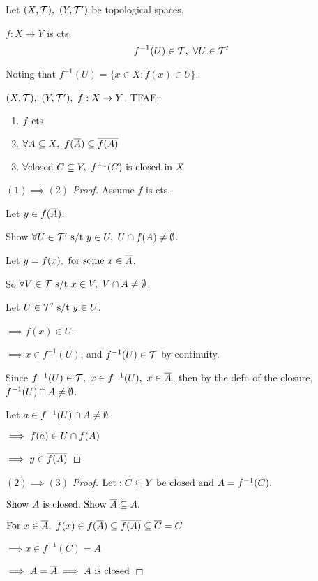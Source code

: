 \documentclass[12pt]{article}
\begin{document}
\bboxdefn
\begin{defn}
    Let \((X,\mathcal T),\ (Y,\mathcal T')\) be topological spaces.

    \(f:X\to Y\) is cts 
    \[
        f^{-1}(U)\in\mathcal T,\ \forall U\in\mathcal T'
    \]

    Noting that \(f^{-1}(U)=\{x\in X:f(x)\in U\}\).
\end{defn}
\ebox

\bboxprop
\begin{prop}
    \((X,\mathcal T),\ (Y,\mathcal T'),\ f:X\to Y\). TFAE:
    \begin{enumerate}
        \item \(f\ \mathrm{cts}\)
        \item \(\forall A\ssq X,\ f(\cls{A})\ssq\cls{f(A)}\)
        \item \(\forall\TR{closed}\ C\ssq Y,\ f^{-1}(C)\ \TR{is\ closed\ in}\ X\)
    \end{enumerate}
\end{prop}
\ebox

\bboxproof
\begin{proof}[\((1)\implies(2)\) Proof]
    Assume \(f\) is cts.

    Let \(y\in f(\overline{A})\).

    Show \(\forall U\in\mathcal T'\text{ s/t } y\in U,\ U\cap f(A)\neq \emptyset\).
    
    Let \(y=f(x),\ \TR{for\ some}\ x\in\cls{A}\).

    So \(\forall V\in\mathcal T\text{ s/t } x\in V,\ V\cap A\neq \emptyset\).

    Let \(U\in\mathcal T'\text{ s/t } y\in U\).

    \(\implies f(x)\in U\).

    \(\implies x\in f^{-1}(U)\), and \(f^{-1}(U)\in\mathcal T\) by continuity.

    Since \(f^{-1}(U)\in\TT,\ x\in f^{-1}(U),\ x\in\cls{A}\),
    then by the defn of the closure,
    \(f^{-1}(U)\cap A\neq \emptyset\).

    Let \(a\in f^{-1}(U)\cap A\neq\emptyset\)

    \(\implies f(a)\in U \cap f(A)\)

    \(\implies y \in \overline{f(A)}\)
\end{proof}
\ebox


\bboxproof
\begin{proof}[\((2)\implies(3)\) Proof]
    \(\llet:C\ssq Y\ \TR{be\ closed\ and}\ A=f^{-1}(C).\)

    \(\TR{Show}\ A\ \is\ \TR{closed}.\ \TR{Show}\ \cls{A}\ssq A.\)

    \(\mathrm{For}\ x\in\overline{A},\ f(x)\in f(\overline{A})\subseteq\overline{f(A)}\subseteq \overline{C}=C\)

    \(\implies x\in f^{-1}(C)=A\)

    \(\implies A=\cls{A}\implies A\ \is\ \TR{closed}\)
\end{proof}
\ebox
\end{document}
